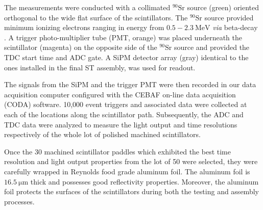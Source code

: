 The measurements were conducted with a collimated $\mathrm{^{90}Sr}$ source (green) oriented orthogonal to the wide flat surface of the scintillators.  The $\mathrm{^{90}Sr}$ source provided minimum ionizing electrons ranging in energy from $\mathrm{0.5-2.3~MeV}$ \textit{via} beta-decay \cite{nndc_sr90}\cite{nndc_y90}.  A trigger photo-multiplier tube (PMT, orange) was placed underneath the scintillator (magenta) on the opposite side of the $\mathrm{^{90}Sr}$ source and provided the TDC start time and ADC gate.  A SiPM detector array (gray) identical to the ones installed in the final ST assembly, was used for readout.  

The signals from the SiPM and the trigger PMT were then recorded in our data acquisition computer configured with the CEBAF on-line data acquisition (CODA) software.  10,000 event triggers and associated data were collected at each of the locations along the scintillator path.  Subsequently, the ADC and TDC data were analyzed to measure the light output and time resolutions respectively of the whole lot of polished machined scintillators.  

Once the 30 machined scintillator paddles which exhibited the best time resolution and light output properties from the lot of 50 were selected, they were carefully wrapped in Reynolds food grade aluminum foil.  The aluminum foil is $\mathrm{16.5~\mu m}$ thick and possesses good reflectivity properties.  Moreover, the aluminum foil protects the surfaces of the scintillators during both the testing and assembly processes.
  
